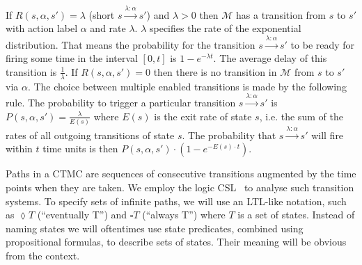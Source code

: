 \documentclass[a4paper, 10pt]{article}
\begin{document}
If $R(s, \alpha, s') = \lambda$ (short $s \xrightarrow{\lambda : \alpha} s'$) and $\lambda > 0$ then $\mathcal{M}$ has a transition from $s$ to $s'$ with action label $\alpha$ and rate $\lambda$.
$\lambda$ specifies the rate of the exponential distribution. That means the probability for the transition $s \xrightarrow{\lambda : \alpha} s'$ to be ready for firing some time in the interval $[0,t]$ is $1-e^{- \lambda t}$. The average delay of this transition is $\frac{1}{\lambda}$.
If $R(s, \alpha, s') = 0$ then there is no transition in $\mathcal{M}$ from $s$ to $s'$ via $\alpha$.
The choice between multiple enabled transitions is made by the following rule.
The probability to trigger a particular transition $s \xrightarrow{\lambda : \alpha} s'$ is $P(s, \alpha, s') = \frac{\lambda}{E(s)}$ where $E(s)$ is the exit rate of state $s$, i.e. the sum of the rates of all outgoing transitions of state $s$.
The probability that $s \xrightarrow{\lambda : \alpha} s'$ will fire within $t$ time units is then $P(s, \alpha, s') \cdot (1 - e^{- E(s) \cdot t})$.

Paths in a CTMC are sequences of consecutive transitions augmented by the time points when they are taken.
We employ the logic CSL~\cite{assb96, bhhk00, knp07} to analyse such transition systems.
To specify sets of infinite paths, we will use an LTL-like notation, such as $\lozenge T$ (``eventually T'') and $\square T$ (``always T'') where $T$ is a set of states.
Instead of naming states we will oftentimes use state predicates, combined using propositional formulas, to describe sets of states. Their meaning will be obvious from the context.
\end{document}
